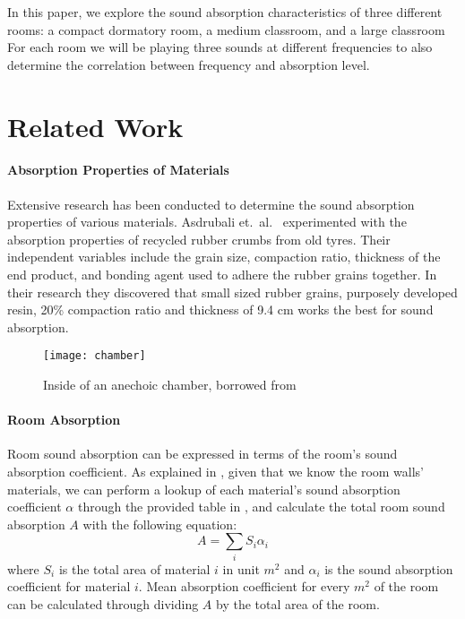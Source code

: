 \documentclass[12pt,onecolumn,letterpaper,draftclsnofoot]{article}
\begin{document}
In this paper, we explore the sound absorption characteristics of three 
different rooms: a compact dormatory room, a medium classroom, and a large
classroom For each room we will be playing three sounds at different
frequencies to also determine the correlation between frequency and absorption
level.

\section{Related Work}

\paragraph{Absorption Properties of Materials} Extensive research has been
conducted to determine the sound absorption properties of various materials.
\cite{commonmaterials} Asdrubali et.\ al.\ \cite{rubber} experimented with the
absorption properties of recycled rubber crumbs from old tyres. Their
independent variables include the grain size, compaction ratio, thickness of
the end product, and bonding agent used to adhere the rubber grains together.
In their research they discovered that small sized rubber grains, purposely
developed resin, 20\% compaction ratio and thickness of 9.4 cm works the best
for sound absorption.
%
\begin{figure}
  \centering
  \texttt{[image: chamber]}
  \caption{Inside of an anechoic chamber, borrowed from \cite{anechoic}}
  \label{fig:chamber}
\end{figure}

\paragraph{Room Absorption} 
Room sound absorption can be expressed in terms of the room's sound absorption
coefficient. As explained in \cite{acousticcoeff}, given that we know the room
walls' materials, we can perform a lookup of each material's sound absorption
coefficient $\alpha$ through the provided table in \cite{acousticcoeff}, and
calculate the total room sound absorption $A$ with the following equation:
%
\begin{equation}
  A = \sum_{i} S_i \alpha_i
\end{equation}
%
where $S_i$ is the total area of material $i$ in unit $m^2$ and $\alpha_i$ is
the sound absorption coefficient for material $i$. Mean absorption coefficient
for every $m^2$ of the room can be calculated through dividing $A$ by the
total area of the room.
\end{document}
